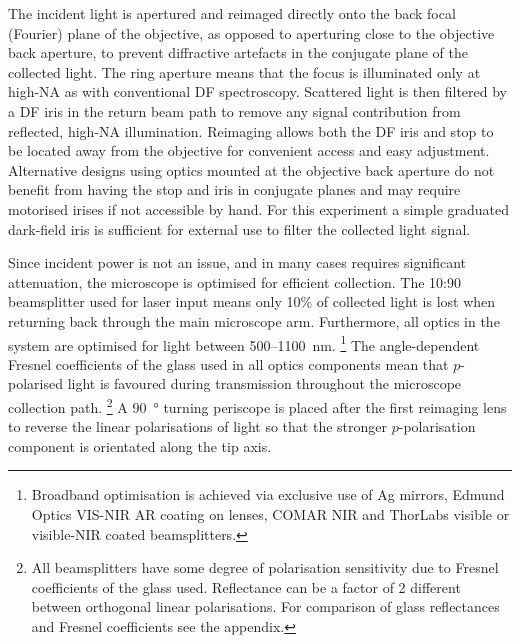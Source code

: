 \documentclass{article}
\begin{document}
The incident light is apertured and reimaged directly onto the back focal (Fourier) plane of the objective, as opposed to aperturing close to the objective back aperture, to prevent diffractive artefacts in the conjugate plane of the collected light. The ring aperture means that the focus is illuminated only at high-NA as with conventional DF spectroscopy. Scattered light is then filtered by a DF iris in the return beam path to remove any signal contribution from reflected, high-NA illumination. Reimaging allows both the DF iris and stop to be located away from the objective for convenient access and easy adjustment. Alternative designs using optics mounted at the objective back aperture do not benefit from having the stop and iris in conjugate planes and may require motorised irises if not accessible by hand. For this experiment a simple graduated dark-field iris is sufficient for external use to filter the collected light signal.

Since incident power is not an issue, and in many cases requires significant attenuation, the microscope is optimised for efficient collection. The 10:90 beamsplitter used for laser input means only 10\% of collected light is lost when returning back through the main microscope arm. Furthermore, all optics in the system are optimised for light between 500--\SI{1100}{nm}.%
\footnote{Broadband optimisation is achieved via exclusive use of Ag mirrors, Edmund Optics VIS-NIR AR coating on lenses, COMAR NIR and ThorLabs visible or visible-NIR coated beamsplitters.}
The angle-dependent Fresnel coefficients of the glass used in all optics components mean that $p$-polarised light is favoured during transmission throughout the microscope collection path.%
\footnote{All beamsplitters have some degree of polarisation sensitivity due to Fresnel coefficients of the glass used. Reflectance can be a factor of 2 different between orthogonal linear polarisations. For comparison of glass reflectances and Fresnel coefficients see the appendix.}
A \SI{90}{\degree} turning periscope is placed after the first reimaging lens to reverse the linear polarisations of light so that the stronger $p$-polarisation component is orientated along the tip axis.
\end{document}
